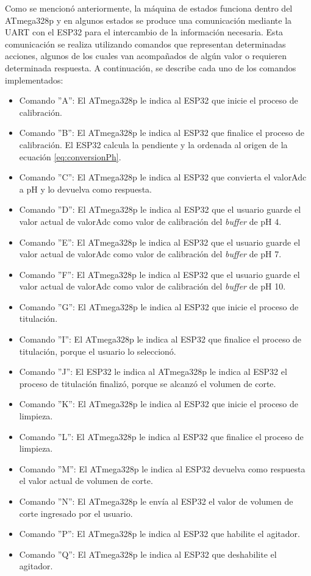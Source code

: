 Como se mencionó anteriormente, la máquina de estados funciona dentro del ATmega328p y en algunos estados se produce una comunicación mediante la UART con el ESP32 para el intercambio de la información necesaria. Esta comunicación se realiza utilizando comandos que representan determinadas acciones, algunos de los cuales van acompañados de algún valor o requieren determinada respuesta. A continuación, se describe cada uno de los comandos implementados:

\begin{itemize}
	\item Comando ''A'': El ATmega328p le indica al ESP32 que inicie el proceso de calibración.
	\item Comando ''B'': El ATmega328p le indica al ESP32 que finalice el proceso de calibración. El ESP32 calcula la pendiente y la ordenada al origen de la ecuación \ref{eq:conversionPh}.
	\item Comando ''C'': El ATmega328p le indica al ESP32 que convierta el valorAdc a pH y lo devuelva como respuesta.
	\item Comando ''D'': El ATmega328p le indica al ESP32 que el usuario guarde el valor actual de valorAdc como valor de calibración del \textit{buffer} de pH 4.
	\item Comando ''E'': El ATmega328p le indica al ESP32 que el usuario guarde el valor actual de valorAdc como valor de calibración del \textit{buffer} de pH 7.
	\item Comando ''F'': El ATmega328p le indica al ESP32 que el usuario guarde el valor actual de valorAdc como valor de calibración del \textit{buffer} de pH 10.
	\item Comando ''G'': El ATmega328p le indica al ESP32 que inicie el proceso de titulación.
	\item Comando ''I'': El ATmega328p le indica al ESP32 que finalice el proceso de titulación, porque el usuario lo seleccionó.  
	\item Comando ''J'': El ESP32 le indica al ATmega328p le indica al ESP32 el proceso de titulación finalizó, porque se alcanzó el volumen de corte.
	\item Comando ''K'': El ATmega328p le indica al ESP32 que inicie el proceso de limpieza.
	\item Comando ''L'': El ATmega328p le indica al ESP32 que finalice el proceso de limpieza.
	\item Comando ''M'': El ATmega328p le indica al ESP32 devuelva como respuesta el valor actual de volumen de corte.
	\item Comando ''N'': El ATmega328p le envía al ESP32 el valor de volumen de corte ingresado por el usuario.
	\item Comando ''P'': El ATmega328p le indica al ESP32 que habilite el agitador.
	\item Comando ''Q'': El ATmega328p le indica al ESP32 que deshabilite el agitador.
\end{itemize}




